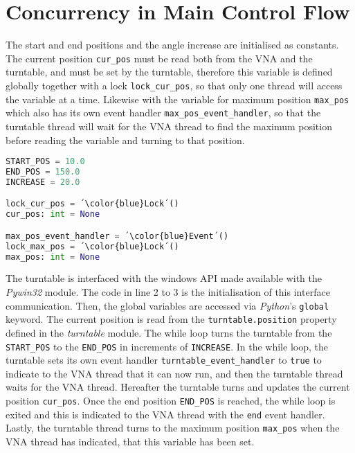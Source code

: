 \section{Concurrency in Main Control Flow}
The start and end positions and the angle increase are initialised as constants. The current position \verb+cur_pos+ must be read both from the VNA and the turntable, and must be set by the turntable, therefore this variable is defined globally together with a lock \verb+lock_cur_pos+, so that only one thread will access the variable at a time. Likewise with the variable for maximum position \verb+max_pos+ which also has its own event handler \verb+max_pos_event_handler+, so that the turntable thread will wait for the VNA thread to find the maximum position before reading the variable and turning to that position.
\begin{lstlisting}[language=Python, caption=Global constants and variables.]
START_POS = 10.0
END_POS = 150.0
INCREASE = 20.0

lock_cur_pos = ´\color{blue}Lock´()
cur_pos: int = None

max_pos_event_handler = ´\color{blue}Event´()
lock_max_pos = ´\color{blue}Lock´()
max_pos: int = None
\end{lstlisting}

The turntable is interfaced with the windows API made available with the \textit{Pywin32} module. The code in line 2 to 3 is the initialisation of this interface communication. Then, the global variables are accessed via \textit{Python}'s \verb+global+ keyword. The current position is read from the \verb+turntable.position+ property defined in the \textit{turntable} module. The while loop turns the turntable from the \verb+START_POS+ to the \verb+END_POS+ in increments of \verb+INCREASE+. In the while loop, the turntable sets its own event handler \verb+turntable_event_handler+ to \verb+true+ to indicate to the VNA thread that it can now run, and then the turntable thread waits for the VNA thread. Hereafter the turntable turns and updates the current position \verb+cur_pos+. Once the end position \verb+END_POS+ is reached, the while loop is exited and this is indicated to the VNA thread with the \verb+end+ event handler. Lastly, the turntable thread turns to the maximum position \verb+max_pos+ when the VNA thread has indicated, that this variable has been set. 

